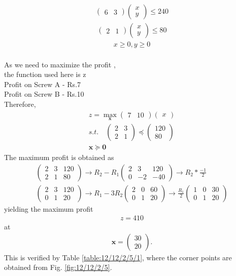 \documentclass[journal,10pt]{article}
\let\vec\mathbf
\newcommand{\myvec}[1]{\ensuremath{\begin{pmatrix}#1\end{pmatrix}}}
\begin{document}
\begin{align}
	\myvec{6 &3}\myvec{x\\y} \leq 240
\end{align}
\begin{align}
	\myvec{2&1}\myvec{x\\y} \leq 80
\end{align}
\begin{align}
	x\geq 0 , y\geq 0
\end{align}
\\
As we need to maximize the profit ,\\
the function used here is z \\
Profit on Screw A - Rs.7\\
Profit on Screw B - Rs.10\\
Therefore,
\fi
\begin{align}
	z = \max_{\vec{x}}\myvec{7&10}\myvec{x}
	\\
	s.t. \quad
	\myvec{2&3 \\ 2 & 1} \preceq \myvec{120 \\ 80}
	\\
	\vec{x} \succeq  \vec{0}
\end{align}
%
The maximum profit is obtained as
\begin{align}
	\myvec{2&3&120\\2&1&80} \longrightarrow {R_2 - R_1} \myvec{2&3&120\\0&-2&-40} \longrightarrow{R_2*\frac{-1}{2}} \\ 
	\myvec{2&3&120\\0&1&20} \longrightarrow{R_1-3R_2} \myvec{2&0&60\\0&1&20} \longrightarrow{\frac{R_1}{2}} \myvec{1&0&30\\0&1&20}
\end{align}
yielding the maximum profit 
\begin{align}
	z = 410
\end{align}
at
\begin{align}
	\vec{x} = \myvec{30 \\ 20}.  
\end{align}
This is verified by Table 
		\ref{table:12/12/2/5/1}, where the corner points are obtained from Fig. 
		\ref{fig:12/12/2/5}.
\end{document}
